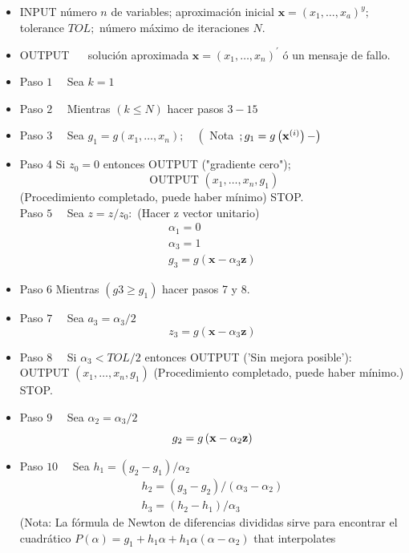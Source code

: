 \begin{itemize}
\item INPUT número $n$ de variables; aproximación inicial $\mathbf{x}=\left(x_{1}, \ldots, x_{a}\right)^{y} ;$ tolerance $T O L ;$ número máximo de iteraciones $N .$
\item OUTPUT $\quad$ solución aproximada $\mathbf{x}=\left(x_{1}, \ldots, x_{n}\right)^{\prime}$ ó un mensaje de fallo.
\item Paso $1 \quad$ Sea $k=1$
\item Paso $2 \quad$ Mientras $(k \leq N)$ hacer pasos $3-15$
\item Paso $3 \quad$ Sea $g_{1}=g\left(x_{1}, \ldots, x_{n}\right) ; \quad\left(\right.$ Nota $\left.;\\ g_{1}=g\left(\mathbf{x}^{(i)}\right)-\right)$
\item Paso 4 Si $z_{0}=0$ entonces OUTPUT ("gradiente cero");
	$$
	\text { OUTPUT }\left(x_{1}, \ldots, x_{n}, g_{1}\right)
	$$
	(Procedimiento completado, puede haber mínimo) STOP.\\
	Paso $5 \quad$ Sea $z=z / z_{0}:$ (Hacer z vector unitario)
	$$
	\begin{array}{l}
		\alpha_{1}=0 \\
		\alpha_{3}=1 \\
		g_{3}=g\left(\mathbf{x}-\alpha_{3} \mathbf{z}\right)
	\end{array}
	$$
\item Paso 6 Mientras $\left(g 3 \geq g_{1}\right)$ hacer pasos 7 y 8.
\item Paso $7 \quad$ Sea $a_{3}=\alpha_{3} / 2$
	$$
	z_{3}=g\left(\mathbf{x}-\alpha_{3} \mathbf{z}\right)
	$$
\item Paso $8 \quad$ Si $\alpha_{3}<T O L / 2$ entonces OUTPUT ('Sin mejora posible'): OUTPUT $\left(x_{1}, \ldots, x_{n}, g_{1}\right)$ (Procedimiento completado, puede haber mínimo.) STOP.
\item Paso $9 \quad$ Sea $\alpha_{2}=\alpha_{3} / 2$
	$$\\
	g_{2}=g\left(\mathbf{x}-\alpha_{2} \mathbf{z}\right)
	$$
\item Paso $10 \quad$ Sea $h_{1}=\left(g_{2}-g_{1}\right) / \alpha_{2}$
	$$
	\begin{array}{l}
		h_{2}=\left(g_{3}-g_{2}\right) /\left(\alpha_{3}-\alpha_{2}\right) \\
		h_{3}=\left(h_{2}-h_{1}\right) / \alpha_{3}
	\end{array}
	$$
	(Nota: La fórmula de Newton de diferencias divididas sirve para encontrar el cuadrático $P(\alpha)=g_{1}+h_{1} \alpha+h_{1} \alpha\left(\alpha-\alpha_{2}\right)$ that interpolates

\end{itemize}
